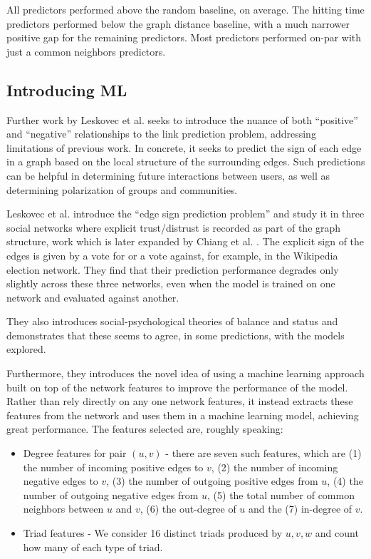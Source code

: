 \documentclass[letterpaper, 11 pt, conference]{ieeeconf}  %
\begin{document}
All predictors performed above the random baseline, on average. The hitting time predictors performed below the graph distance baseline, with a much narrower positive gap for the remaining predictors. Most predictors performed on-par with just a common neighbors predictors.

\subsection{Introducing ML}

Further work by Leskovec et al. \cite{Leskovec:2010:PPN:1772690.1772756} seeks to introduce the nuance of both ``positive'' and ``negative'' relationships to the link prediction problem, addressing limitations of previous work. In concrete, it seeks to predict the sign of each edge in a graph based on the local structure of the surrounding edges. Such predictions can be helpful in determining future interactions between users, as well as determining polarization of groups and communities. 

Leskovec et al. introduce the ``edge sign prediction problem'' and study it in three social networks where explicit trust/distrust is recorded as part of the graph structure, work which is later expanded by Chiang et al. \cite{Chiang:2011:ELC:2063576.2063742}. The explicit sign of the edges is given by a vote for or a vote against, for example, in the Wikipedia election network. They find that their prediction performance degrades only slightly across these three networks, even when the model is trained on one network and evaluated against another.

They also introduces social-psychological theories of balance and status and demonstrates that these seems to agree, in some predictions, with the models explored.

Furthermore, they introduces the novel idea of using a machine learning approach built on top of the network features to improve the performance of the model. Rather than rely directly on any one network features, it instead extracts these features from the network and uses them in a machine learning model, achieving great performance. The features selected are, roughly speaking:

\begin{itemize}
\item Degree features for pair $(u,v)$ - there are seven such features, which are (1) the number of incoming positive edges to $v$, (2) the number of incoming negative edges to $v$, (3) the number of outgoing positive edges from $u$, (4) the number of outgoing negative edges from $u$, (5) the total number of common neighbors between $u$ and $v$, (6) the out-degree of $u$ and the (7) in-degree of $v$.
\item Triad features - We consider 16 distinct triads produced by $u,v,w$ and count how many of each type of triad.
\end{itemize}
\end{document}
